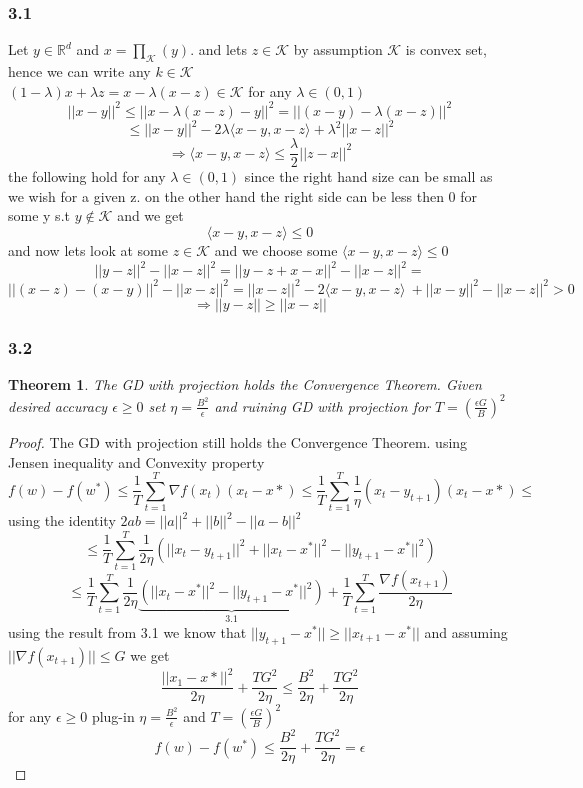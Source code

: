 \documentclass[12pt]{article}
\theoremstyle{plain}
\newtheorem*{theorem*}{Theorem}
\begin{document}
\subsubsection*{3.1}
Let $y \in  \mathbb{R}^d$
and $x = \prod_{\mathcal{K}} (y).$ and lets $z\in \mathcal{K}$ by assumption $\mathcal{K} $ is convex set, hence we can write any $k\in \mathcal{K}$   \\$(1-\lambda)x+\lambda z=x-\lambda(x-z)\in \mathcal{K} $ for any $\lambda \in (0,1)$
\[||x-y||^2\leq  ||x-\lambda(x-z)-y||^2=
||(x-y)-\lambda(x-z)||^2
\]
\[\leq ||x-y||^2-2\lambda \langle x-y,x-z \rangle+\lambda^2||x-z||^2
\]
\[ \Rightarrow \langle x-y,x-z \rangle \leq 
\frac{\lambda}{2}||z-x||^2
\]
the following hold for any $\lambda \in (0,1)$ since the right hand size can be   small as we wish  for a given z. on the other hand the right side can be less then 0 for some y s.t $y\notin \mathcal{K} $ and we get\\
\[\langle x-y,x-z \rangle \leq 0
\]
and now lets look at some $z\in \mathcal{K}$
and we choose some  $\langle x-y,x-z \rangle \leq 0$ 
\[||y-z||^2-||x-z||^2=||y-z+x-x||^2-||x-z||^2=
\]
\[ ||(x-z)-(x-y)||^2-||x-z||^2 = ||x-z||^2-2\langle  x-y,x-z \rangle \ +||x-y||^2-||x-z||^2>0
\]
\[\Rightarrow ||y-z|| \geq ||x-z||
\]
\subsubsection*{3.2}
\begin{theorem*}
The GD with projection  holds the Convergence Theorem. Given desired accuracy  $\epsilon\geq 0$ set $\eta=\frac{B^2}{\epsilon}$ and ruining GD with projection for $T=\left(\frac{\epsilon G}{B}\right)^2$
\end{theorem*}
\begin{proof}
The GD with projection still holds the Convergence Theorem. using Jensen inequality and Convexity property
 \[f({w})-f(w^*)\leq \frac{1}{T}\sum^T_{t=1}\nabla f(x_t)(x_t-x*)\leq \frac{1}{T}\sum^T_{t=1}\frac{1}{\eta}(x_t-y_{t+1})(x_t-x*)\leq
 \] 
using the  identity $2ab=||a||^2+||b||^2-||a-b||^2$
 \[ \leq \frac{1}{T}\sum^T_{t=1}\frac{1}{2\eta}\left( ||x_t-y_{t+1}||^2+||x_t-x^*||^2 - ||y_{t+1}-x^*||^2\right)
\]
\[ \leq \frac{1}{T}\sum^T_{t=1}\frac{1}{2\eta}\underbrace{\left( ||x_t-x^*||^2-||y_{t+1}-x^*||^2\right)}_{3.1 }+\frac{1}{T}\sum^T_{t=1} \frac{\nabla f(x_{t+1})}{2\eta} \]
using the result from 3.1 we know that $||y_{t+1}-x^*||\geq||x_{t+1}-x^*|| $  and assuming $||\nabla f(x_{t+1})||\leq G$ we get
\[\frac{||x_1-x*||^2}{2\eta}+\frac{TG^2}{2\eta}\leq \frac{B^2}{2\eta}+\frac{TG^2}{2\eta}
\]
for any $\epsilon \geq 0$ plug-in $\eta=\frac{B^2}{\epsilon}$ and $T=\left(\frac{\epsilon G}{B}\right)^2$  
\[f({w})-f(w^*)\leq \frac{B^2}{2\eta}+\frac{TG^2}{2\eta}=\epsilon
\]
\end{proof}
\end{document}
